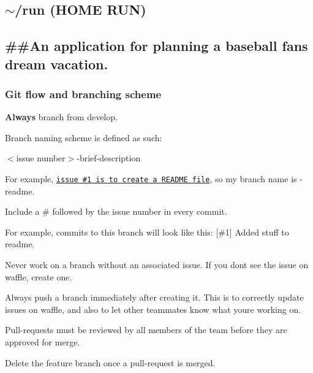 \href{http://waffle.io/home-run/subtle-cosmic-moose}{\tt }

\subsection*{$\sim$/run (H\+O\+ME R\+UN)}

\subsection*{\#\#\+An application for planning a baseball fan\textquotesingle{}s dream vacation. }

\subsubsection*{Git flow and branching scheme}


\begin{DoxyEnumerate}
\item {\bfseries Always} branch from {\ttfamily develop}.
\item Branch naming scheme is defined as such\+:
\begin{DoxyItemize}
\item {\ttfamily $<$issue number$>$-\/brief-\/description}
\item For example, \href{https://waffle.io/home-run/subtle-cosmic-moose/cards/56fa022814437c0e00ba6c1e}{\tt issue \#1 is to create a R\+E\+A\+D\+ME file}, so my branch name is {-\/readme}.
\end{DoxyItemize}
\item Include a \textquotesingle{}\#\textquotesingle{} followed by the issue number in every commit.
\begin{DoxyItemize}
\item For example, commits to this branch will look like this\+: {\ttfamily \mbox{[}\#1\mbox{]} Added stuff to readme.}
\end{DoxyItemize}
\item Never work on a branch without an associated issue. If you don\textquotesingle{}t see the issue on waffle, create one.
\item Always push a branch immediately after creating it. This is to correctly update issues on waffle, and also to let other teammates know what you\textquotesingle{}re working on.
\item Pull-\/requests must be reviewed by all members of the team before they are approved for merge.
\item Delete the feature branch once a pull-\/request is merged.
\end{DoxyEnumerate}


